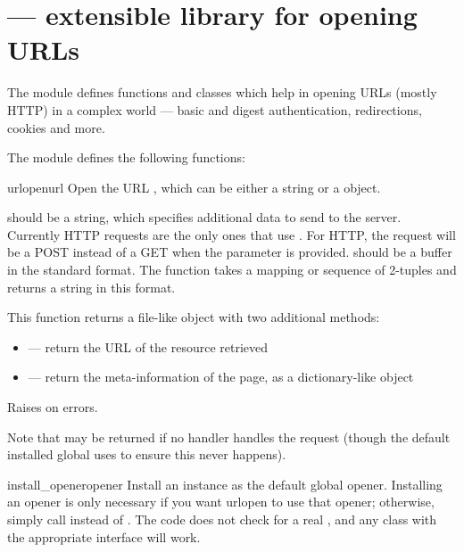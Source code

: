 \section{ ---
         extensible library for opening URLs}



The  module defines functions and classes which help
in opening URLs (mostly HTTP) in a complex world --- basic and digest
authentication, redirections, cookies and more.

The  module defines the following functions:

\begin{funcdesc}{urlopen}{url}
Open the URL , which can be either a string or a 
object.

 should be a string, which specifies additional data to send
to the server. Currently HTTP requests are the only ones that use
.  For HTTP, the request will be a POST instead of a GET
when the  parameter is provided.   should be a
buffer in the standard  format.
The  function takes a mapping or 
sequence of 2-tuples and returns a string in this format.

This function returns a file-like object with two additional methods:

\begin{itemize}
  \item {} --- return the URL of the resource retrieved
  \item {} --- return the meta-information of the page, as
                            a dictionary-like object
\end{itemize}

Raises  on errors.

Note that  may be returned if no handler handles the
request (though the default installed global 
uses  to ensure this never happens).
\end{funcdesc}

\begin{funcdesc}{install_opener}{opener}
Install an  instance as the default global
opener.  Installing an opener is only necessary if you want urlopen to
use that opener; otherwise, simply call 
instead of .  The code does not check for a real
, and any class with the appropriate interface
will work.
\end{funcdesc}

